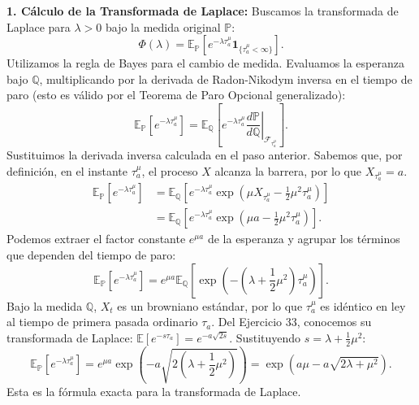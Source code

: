 \documentclass[11pt, letterpaper]{article}
\begin{document}
\begin{solucion}
    \textbf{1. Cálculo de la Transformada de Laplace:}
    Buscamos la transformada de Laplace para $\lambda > 0$ bajo la medida original $\mathbb{P}$:
    \[ \Phi(\lambda) = \mathbb{E}_{\mathbb{P}}\left[ e^{-\lambda \tau_a^\mu} \mathbf{1}_{\{\tau_a^\mu < \infty\}} \right]. \]
    Utilizamos la regla de Bayes para el cambio de medida. Evaluamos la esperanza bajo $\mathbb{Q}$, multiplicando por la derivada de Radon-Nikodym inversa en el tiempo de paro (esto es válido por el Teorema de Paro Opcional generalizado):
    \[ \mathbb{E}_{\mathbb{P}}\left[ e^{-\lambda \tau_a^\mu} \right] = \mathbb{E}_{\mathbb{Q}}\left[ e^{-\lambda \tau_a^\mu} \left.\frac{d\mathbb{P}}{d\mathbb{Q}}\right|_{\mathcal{F}_{\tau_a^\mu}} \right]. \]
    Sustituimos la derivada inversa calculada en el paso anterior. Sabemos que, por definición, en el instante $\tau_a^\mu$, el proceso $X$ alcanza la barrera, por lo que $X_{\tau_a^\mu} = a$.
    \begin{align*}
        \mathbb{E}_{\mathbb{P}}\left[ e^{-\lambda \tau_a^\mu} \right] &= \mathbb{E}_{\mathbb{Q}}\left[ e^{-\lambda \tau_a^\mu} \exp\left( \mu X_{\tau_a^\mu} - \frac{1}{2}\mu^2 \tau_a^\mu \right) \right] \\
        &= \mathbb{E}_{\mathbb{Q}}\left[ e^{-\lambda \tau_a^\mu} \exp\left( \mu a - \frac{1}{2}\mu^2 \tau_a^\mu \right) \right].
    \end{align*}
    Podemos extraer el factor constante $e^{\mu a}$ de la esperanza y agrupar los términos que dependen del tiempo de paro:
    \[ \mathbb{E}_{\mathbb{P}}\left[ e^{-\lambda \tau_a^\mu} \right] = e^{\mu a} \mathbb{E}_{\mathbb{Q}}\left[ \exp\left( -\left(\lambda + \frac{1}{2}\mu^2\right) \tau_a^\mu \right) \right]. \]
    Bajo la medida $\mathbb{Q}$, $X_t$ es un browniano estándar, por lo que $\tau_a^\mu$ es idéntico en ley al tiempo de primera pasada ordinario $\tau_a$. Del Ejercicio 33, conocemos su transformada de Laplace: $\mathbb{E}[e^{-s \tau_a}] = e^{-a\sqrt{2s}}$.
    Sustituyendo $s = \lambda + \frac{1}{2}\mu^2$:
    \[ \mathbb{E}_{\mathbb{P}}\left[ e^{-\lambda \tau_a^\mu} \right] = e^{\mu a} \exp\left( -a\sqrt{2\left(\lambda + \frac{1}{2}\mu^2\right)} \right) = \exp\left( a\mu - a\sqrt{2\lambda + \mu^2} \right). \]
    Esta es la fórmula exacta para la transformada de Laplace.


\end{solucion}
\end{document}

